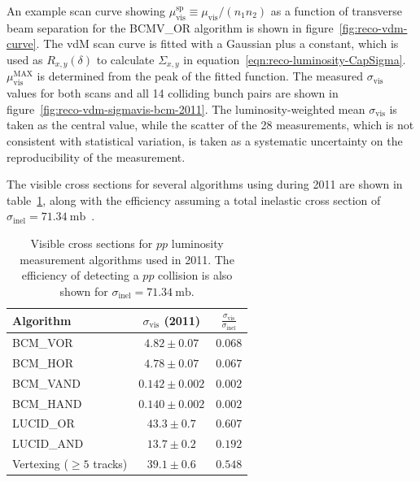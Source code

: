 An example scan curve showing $\mu_{\mathrm{vis}}^{\mathrm{sp}}\equiv \mu_{\mathrm{vis}}/(n_1n_2)$ as a function of transverse beam separation for the BCMV\_OR algorithm is shown in figure~\ref{fig:reco-vdm-curve}. The vdM scan curve is fitted with a Gaussian plus a constant, which is used as $R_{x,y}(\delta)$ to calculate $\Sigma_{x,y}$ in equation~\ref{eqn:reco-luminosity-CapSigma}. $\mu_{\mathrm{vis}}^{\mathrm{MAX}}$ is determined from the peak of the fitted function. The measured $\sigma_{\mathrm{vis}}$ values for both scans and all 14 colliding bunch pairs are shown in figure~\ref{fig:reco-vdm-sigmavis-bcm-2011}. The luminosity-weighted mean $\sigma_{\mathrm{vis}}$ is taken as the central value, while the scatter of the 28 measurements, which is not consistent with statistical variation, is taken as a systematic uncertainty on the reproducibility of the measurement. 

The visible cross sections for several algorithms using during 2011 are shown in table~\ref{table:reco-luminosity-sigmavis-summary}, along with the efficiency assuming a total inelastic cross section of $\sigma_{\mathrm{inel}}= 71.34~\mbox{mb}$~\cite{TheATLASCollaboration:2014jo}.

\begin{table}[htbp]
	\centering
	\begin{tabular}{|l|c|c|}
		\hline
		Algorithm & $\sigma_{\mathrm{vis}}$ (2011) & $\frac{\sigma_{\mathrm{vis}}}{\sigma_{\mathrm{inel}}}$ \\
		\hline
		BCM\_VOR					&	$4.82\pm0.07$	&	$0.068$ \\
		\hline
		BCM\_HOR					&	$4.78\pm0.07$	&	$0.067$ \\
		\hline
		BCM\_VAND					&	$0.142\pm0.002$	&	$0.002$ \\
		\hline
		BCM\_HAND					&	$0.140\pm0.002$	&	$0.002$ \\
		\hline
		LUCID\_OR					&	$43.3\pm0.7$	&	$0.607$ \\
		\hline
		LUCID\_AND					&	$13.7\pm0.2$	&	$0.192$ \\
		\hline
		Vertexing ($\geq5$ tracks)	&	$39.1\pm0.6$	&	$0.548$ \\
		\hline
	\end{tabular}
	\caption{Visible cross sections for $pp$ luminosity measurement algorithms used in 2011. The efficiency of detecting a $pp$ collision is also shown for $\sigma_{\mathrm{inel}}=\SI{71.34}{\milli\barn}$.}
	\label{table:reco-luminosity-sigmavis-summary}
\end{table}


